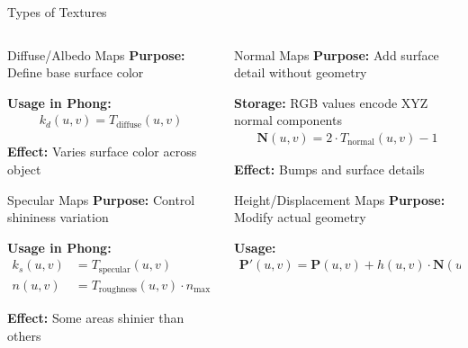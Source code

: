\begin{frame}{Types of Textures}
  \footnotesize
  \begin{columns}
    \begin{column}{0.5\textwidth}
      \begin{conceptbox}{Diffuse/Albedo Maps}
        \footnotesize
        \textbf{Purpose:} Define base surface color

        \textbf{Usage in Phong:}
        \begin{align*}
          k_d(u,v) = T_{\text{diffuse}}(u,v)
        \end{align*}

        \textbf{Effect:} Varies surface color across object
      \end{conceptbox}

      \begin{conceptbox}{Specular Maps}
        \footnotesize
        \textbf{Purpose:} Control shininess variation

        \textbf{Usage in Phong:}
        \begin{align*}
          k_s(u,v) &= T_{\text{specular}}(u,v) \\
          n(u,v) &= T_{\text{roughness}}(u,v) \cdot n_{\max}
        \end{align*}

        \textbf{Effect:} Some areas shinier than others
      \end{conceptbox}
    \end{column}
    \begin{column}{0.5\textwidth}
      \begin{conceptbox}{Normal Maps}
        \footnotesize
        \textbf{Purpose:} Add surface detail without geometry

        \textbf{Storage:} RGB values encode XYZ normal components
        \begin{align*}
          \mathbf{N}(u,v) = 2 \cdot T_{\text{normal}}(u,v) - 1
        \end{align*}

        \textbf{Effect:} Bumps and surface details
      \end{conceptbox}

      \begin{conceptbox}{Height/Displacement Maps}
        \footnotesize
        \textbf{Purpose:} Modify actual geometry

        \textbf{Usage:}
        \begin{align*}
          \mathbf{P}'(u,v) = \mathbf{P}(u,v) + h(u,v) \cdot \mathbf{N}(u,v)
        \end{align*}


\end{conceptbox}
\end{column}
\end{columns}
\end{frame}
